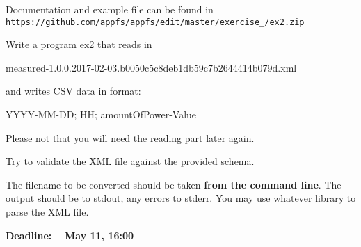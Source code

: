 Documentation and example file can be found in \href{https://github.com/appfs/appfs/edit/master/exercise_2/ex2.zip}{\tt https\+://github.\+com/appfs/appfs/edit/master/exercise\+\_/ex2.\+zip}

Write a program ex2 that reads in \begin{DoxyVerb}measured-1.0.0.2017-02-03.b0050c5c8deb1db59c7b2644414b079d.xml
\end{DoxyVerb}


and writes C\+SV data in format\+: \begin{DoxyVerb}YYYY-MM-DD; HH; amountOfPower-Value
\end{DoxyVerb}


Please not that you will need the reading part later again.

Try to validate the X\+ML file against the provided schema.

The filename to be converted should be taken {\bfseries from the command line}. The output should be to stdout, any errors to stderr. You may use whatever library to parse the X\+ML file.

{\bfseries Deadline\+:   May 11, 16\+:00} 